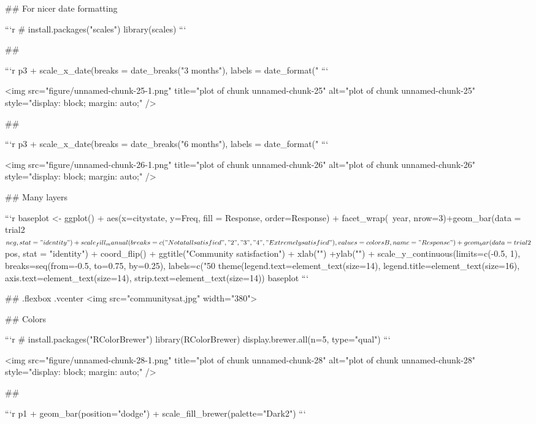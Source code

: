 ## For nicer date formatting

```r
# install.packages("scales") 
library(scales)
```

##

```r
p3 + 
  scale_x_date(breaks = date_breaks("3 months"), 
                   labels = date_format("%
```

<img src="figure/unnamed-chunk-25-1.png" title="plot of chunk unnamed-chunk-25" alt="plot of chunk unnamed-chunk-25" style="display: block; margin: auto;" />

##

```r
p3 + 
  scale_x_date(breaks = date_breaks("6 months"), 
                   labels = date_format("%
```

<img src="figure/unnamed-chunk-26-1.png" title="plot of chunk unnamed-chunk-26" alt="plot of chunk unnamed-chunk-26" style="display: block; margin: auto;" />



## Many layers

```r
baseplot <- ggplot() + 
  aes(x=citystate, y=Freq, fill = Response, order=Response) +
  facet_wrap(~year, nrow=3)+geom_bar(data = trial2$neg, stat = "identity") + 
  scale_fill_manual(breaks=c("Not at all satisfied", "2", "3", "4", 
                             "Extremely satisfied"), values=colorsB, 
                    name="Response") + 
  geom_bar(data = trial2$pos, stat = "identity") + coord_flip() + 
  ggtitle("Community satisfaction") + xlab("") +ylab("") + 
  scale_y_continuous(limits=c(-0.5, 1), 
                     breaks=seq(from=-0.5, to=0.75, by=0.25), 
                     labels=c("50%
  theme(legend.text=element_text(size=14), 
        legend.title=element_text(size=16), 
        axis.text=element_text(size=14), 
        strip.text=element_text(size=14))
baseplot 
```

## {.flexbox .vcenter}
<img src="communitysat.jpg" width="380">

## Colors


```r
# install.packages("RColorBrewer")
library(RColorBrewer)
display.brewer.all(n=5, type="qual")
```

<img src="figure/unnamed-chunk-28-1.png" title="plot of chunk unnamed-chunk-28" alt="plot of chunk unnamed-chunk-28" style="display: block; margin: auto;" />

## 

```r
p1 + geom_bar(position="dodge") + scale_fill_brewer(palette="Dark2")
```

